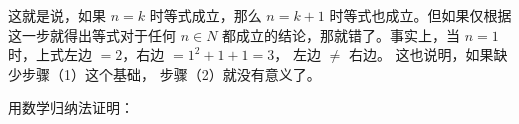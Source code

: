 这就是说，如果 $n = k$ 时等式成立，那么 $n = k + 1$ 时等式也成立。但如果仅根据这一步就得出等式对于任何 $n \in N$
都成立的结论，那就错了。事实上，当 $n = 1$ 时，上式左边 $= 2$，右边 $= 1^2 + 1 + 1 = 3$， 左边 $\neq$ 右边。
这也说明，如果缺少步骤（1）这个基础， 步骤（2）就没有意义了。

\lianxi

用数学归纳法证明：

\begin{xiaotis}




\end{xiaotis}

